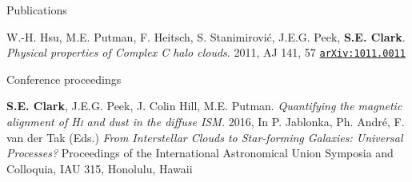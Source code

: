 \documentclass{resume_clark} %
\begin{document}
\begin{rSection}{Publications}
\begin{etaremune}
\item W.-H. Hsu, M.E. Putman, F. Heitsch, S. Stanimirovi\' c, J.E.G. Peek, {\bf S.E. Clark}. {\em Physical properties of Complex C halo clouds}. 2011, {AJ 141, 57} \href{https://arxiv.org/abs/1011.0011}{\tt arXiv:1011.0011}
\end{etaremune}

Conference proceedings

\begin{etaremune}
\item {\bf S.E. Clark}, J.E.G. Peek, J. Colin Hill, M.E. Putman. \textit{Quantifying the magnetic alignment of {\textit{\textsc{Hi}}} and dust in the diffuse ISM.} 2016, In P. Jablonka, Ph. Andr\'e, F. van der Tak (Eds.) {\it From Interstellar Clouds to Star-forming Galaxies: Universal Processes?} Proceedings of the International Astronomical Union Symposia and Colloquia, IAU 315, Honolulu, Hawaii
\end{etaremune}

\end{rSection}
\end{document}
